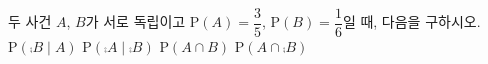 두 사건 $A$, $B$가 서로 독립이고 $\mathrm{P}(A)=\dfrac{3}{5}$, $\mathrm{P}(B)=\dfrac{1}{6}$일 때, 다음을 구하시오.
 $\mathrm{P}(\comp{B}\mid A)$
 $\mathrm{P}(\comp{A}\mid \comp{B})$
 $\mathrm{P}(A\cap B)$
 $\mathrm{P}(A\cap\comp{B})$
